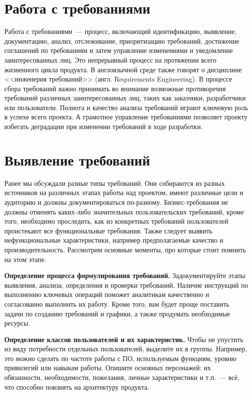 \documentclass{../../text-style}
\begin{document}
\section{Работа с требованиями}

Работа с требованиями~--- процесс, включающий идентификацию, выявление, документацию, анализ, отслеживание, приоритизацию требований, достижение соглашений по требованиям и затем управление изменениями и уведомление заинтересованных лиц. Это непрерывный процесс на протяжении всего жизненного цикла продукта. В англоязычной среде также говорят о дисциплине <<инженерия требований>> (англ. Requirements Engineering). В процессе сбора требований важно принимать во внимание возможные противоречия требований различных заинтересованных лиц, таких как заказчики, разработчики или пользователи. Полнота и качество анализа требований играют ключевую роль в успехе всего проекта. А грамотное управление требованиями позволяет проекту избегать деградации при изменении требований в ходе разработки.

\section{Выявление требований}

Ранее мы обсуждали разные типы требований. Они собираются из разных источников на различных этапах работы над проектом, имеют различные цели и аудиторию и должны документироваться по-разному. Бизнес-требования не должны отменять каких-либо значительных пользовательских требований, кроме того, необходимо проследить, как из конкретных требований пользователей проистекают все функциональные требования. Также следует выявить нефункциональные характеристики, например предполагаемые качество и производительность. Рассмотрим основные моменты, про которые стоит помнить на этом этапе.

\textbf{Определение процесса формулирования требований.} Задокументируйте этапы выявления, анализа, определения и проверки требований. Наличие инструкций по выполнению ключевых операций поможет аналитикам качественно и согласованно выполнить их работу. Кроме того, вам будет проще поставить задачи по созданию требований и графики, а также продумать необходимые ресурсы.

\textbf{Определение классов пользователей и их характеристик.} Чтобы не упустить из виду потребности отдельных пользователей, выделите их в группы. Например, это можно сделать по частоте работы с ПО, используемым функциям, уровню привилегий или навыкам работы. Опишите основных персонажей: их обязанности, необходимости, пожелания, личные характеристики и т.п.~--- всё, что способно повлиять на архитектуру продукта.
\end{document}
